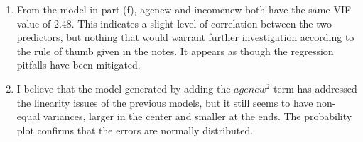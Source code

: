 \documentclass{article}
\begin{document}
\begin{enumerate}
\def\labelenumi{\alph{enumi})}
\setcounter{enumi}{6}
\item
  From the model in part (f), agenew and incomenew both have the same
  VIF value of 2.48. This indicates a slight level of correlation
  between the two predictors, but nothing that would warrant further
  investigation according to the rule of thumb given in the notes. It
  appears as though the regression pitfalls have been mitigated.
\item
  I believe that the model generated by adding the \(agenew^2\) term has
  addressed the linearity issues of the previous models, but it still
  seems to have non-equal variances, larger in the center and smaller at
  the ends. The probability plot confirms that the errors are normally
  distributed.
  
\begin{figure}[!h]
  \begin{floatrow}
  \end{floatrow}
\end{figure}
  
\end{enumerate}
\end{document}
